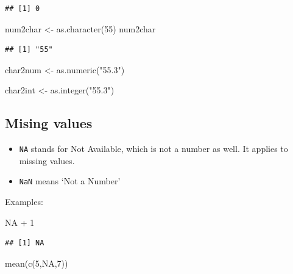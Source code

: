 \documentclass[
]{book}
\newenvironment{Shaded}{\begin{snugshade}}{\end{snugshade}}
\newcommand{\ConstantTok}[1]{\textcolor[rgb]{0.00,0.00,0.00}{#1}}
\newcommand{\DecValTok}[1]{\textcolor[rgb]{0.00,0.00,0.81}{#1}}
\newcommand{\FunctionTok}[1]{\textcolor[rgb]{0.00,0.00,0.00}{#1}}
\newcommand{\NormalTok}[1]{#1}
\newcommand{\OtherTok}[1]{\textcolor[rgb]{0.56,0.35,0.01}{#1}}
\newcommand{\SpecialCharTok}[1]{\textcolor[rgb]{0.00,0.00,0.00}{#1}}
\newcommand{\StringTok}[1]{\textcolor[rgb]{0.31,0.60,0.02}{#1}}
\providecommand{\tightlist}{%
  \setlength{\itemsep}{0pt}\setlength{\parskip}{0pt}}
\begin{document}
\begin{verbatim}
## [1] 0
\end{verbatim}

\begin{Shaded}
\begin{Highlighting}[]
\NormalTok{num2char }\OtherTok{\textless{}{-}} \FunctionTok{as.character}\NormalTok{(}\DecValTok{55}\NormalTok{)}
\NormalTok{num2char}
\end{Highlighting}
\end{Shaded}

\begin{verbatim}
## [1] "55"
\end{verbatim}

\begin{Shaded}
\begin{Highlighting}[]
\NormalTok{char2num  }\OtherTok{\textless{}{-}} \FunctionTok{as.numeric}\NormalTok{(}\StringTok{"55.3"}\NormalTok{)}

\NormalTok{char2int  }\OtherTok{\textless{}{-}} \FunctionTok{as.integer}\NormalTok{(}\StringTok{"55.3"}\NormalTok{)}
\end{Highlighting}
\end{Shaded}

\hypertarget{mising-values}{%
\subsection{Mising values}\label{mising-values}}

\begin{itemize}
\tightlist
\item
  \texttt{NA} stands for Not Available, which is not a number as well. It applies to missing values.
\item
  \texttt{NaN} means `Not a Number'
\end{itemize}

Examples:

\begin{Shaded}
\begin{Highlighting}[]
\ConstantTok{NA} \SpecialCharTok{+} \DecValTok{1}
\end{Highlighting}
\end{Shaded}

\begin{verbatim}
## [1] NA
\end{verbatim}

\begin{Shaded}
\begin{Highlighting}[]
\FunctionTok{mean}\NormalTok{(}\FunctionTok{c}\NormalTok{(}\DecValTok{5}\NormalTok{,}\ConstantTok{NA}\NormalTok{,}\DecValTok{7}\NormalTok{))}
\end{Highlighting}
\end{Shaded}
\end{document}
